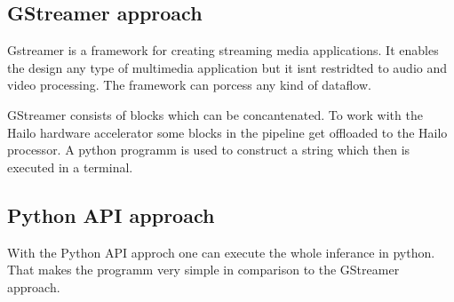 \subsection{GStreamer approach}

Gstreamer is a framework for creating streaming media applications.
It enables the design any type of multimedia application but it isnt restridted to audio and video processing.
The framework can porcess any kind of dataflow.

GStreamer consists of blocks which can be concantenated.
To work with the Hailo hardware accelerator some blocks in the pipeline get offloaded to the Hailo processor.
A python programm is used to construct a string which then is executed in a terminal.


\subsection{Python API approach}

With the Python API approch one can execute the whole inferance in python.
That makes the programm very simple in comparison to the GStreamer approach.